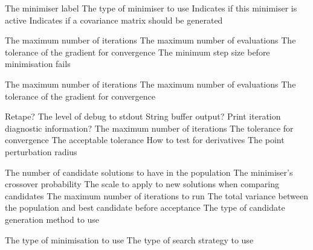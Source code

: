 \par\par
{} {The minimiser label}
 {The type of minimiser to use}
 {Indicates if this minimiser is active}
 {Indicates if a covariance matrix should be generated}
\par\textbf{}\par
{} {The maximum number of iterations}
 {The maximum number of evaluations}
 {The tolerance of the gradient for convergence}
 {The minimum step size before minimisation fails}
\par\textbf{}\par
{} {The maximum number of iterations}
 {The maximum number of evaluations}
 {The tolerance of the gradient for convergence}
\par\textbf{}\par
{} {Retape?}
 {The level of debug to stdout}
 {String buffer output?}
 {Print iteration diagnostic information?}
 {The maximum number of iterations}
 {The tolerance for convergence}
 {The acceptable tolerance}
 {}
 {How to test for derivatives}
 {The point perturbation radius}
\par\textbf{}\par
{} {The number of candidate solutions to have in the population}
 {The minimiser's crossover probability}
 {The scale to apply to new solutions when comparing candidates}
 {The maximum number of iterations to run}
 {The total variance between the population and best candidate before acceptance}
 {The type of candidate generation method to use}
\par\textbf{}\par
{} {The type of minimisation to use}
 {The type of search strategy to use}

